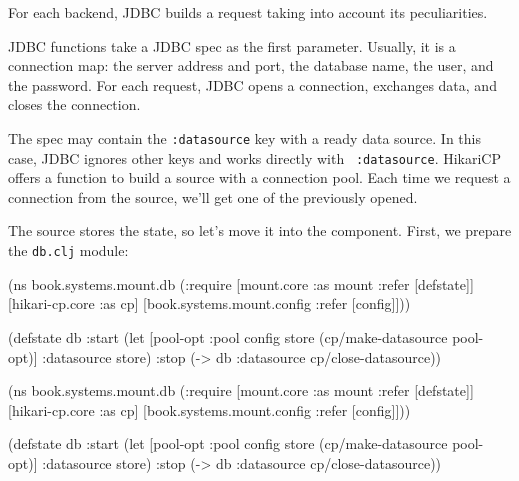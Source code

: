 \fi

\noindent
For each backend, JDBC builds a request taking into account its peculiarities.


JDBC functions take a JDBC spec as the first parameter. Usually, it is a connection map: the server address and port, the database name, the user, and the password. For each request, JDBC opens a connection, exchanges data, and closes the connection.

The spec may contain the \verb|:datasource| key with a ready data source. In this case, JDBC ignores other keys and works directly with ~\verb|:datasource|. HikariCP offers a function to build a source with a connection pool. Each time we request a connection from the source, we'll get one of the previously opened.


The source stores the state, so let's move it into the component. First, we prepare the \verb|db.clj| module:

\ifnarrow

\begin{english}
  \begin{clojure}
(ns book.systems.mount.db
  (:require
   [mount.core :as mount
    :refer [defstate]]
   [hikari-cp.core :as cp]
   [book.systems.mount.config
    :refer [config]]))

(defstate db
  :start
  (let [{pool-opt :pool} config
        store (cp/make-datasource
                pool-opt)]
    {:datasource store})
  :stop
  (-> db
      :datasource
      cp/close-datasource))
  \end{clojure}
\end{english}

\else

\begin{english}
  \begin{clojure}
(ns book.systems.mount.db
  (:require
   [mount.core :as mount :refer [defstate]]
   [hikari-cp.core :as cp]
   [book.systems.mount.config :refer [config]]))

(defstate db
  :start
  (let [{pool-opt :pool} config
        store (cp/make-datasource pool-opt)]
    {:datasource store})
  :stop
  (-> db :datasource cp/close-datasource))
  \end{clojure}
\end{english}

\fi


